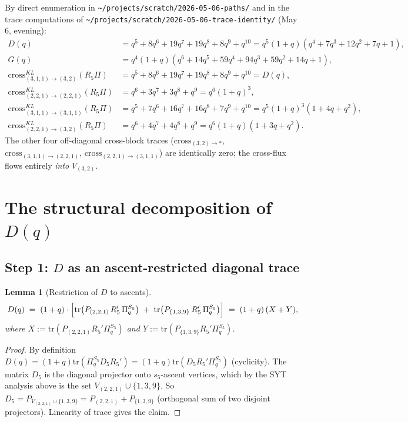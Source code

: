 \documentclass[11pt]{article}
\newtheorem{lemma}[theorem]{Lemma}
\theoremstyle{definition}
\begin{document}
By direct enumeration in
\texttt{\textasciitilde/projects/scratch/2026-05-06-paths/} and in the trace
computations of \texttt{\textasciitilde/projects/scratch/2026-05-06-trace-identity/}
(May 6, evening):
\begin{align*}
D(q) &= q^5 + 8q^6 + 19q^7 + 19q^8 + 8q^9 + q^{10} = q^5(1+q)(q^4 + 7q^3 + 12q^2 + 7q + 1), \\
G(q) &= q^4(1+q)(q^6 + 14q^5 + 59q^4 + 94q^3 + 59q^2 + 14q + 1), \\
\mathrm{cross}_{(3,1,1) \to (3,2)}^{KL}(R_5 \Pi) &= q^5 + 8q^6 + 19q^7 + 19q^8 + 8q^9 + q^{10} = D(q),\\
\mathrm{cross}_{(2,2,1) \to (2,2,1)}^{KL}(R_5 \Pi) &= q^6 + 3q^7 + 3q^8 + q^9 = q^6(1+q)^3,\\
\mathrm{cross}_{(3,1,1) \to (3,1,1)}^{KL}(R_5 \Pi) &= q^5 + 7q^6 + 16q^7 + 16q^8 + 7q^9 + q^{10} = q^5(1+q)^3(1+4q+q^2),\\
\mathrm{cross}_{(2,2,1) \to (3,2)}^{KL}(R_5 \Pi) &= q^6 + 4q^7 + 4q^8 + q^9 = q^6(1+q)(1+3q+q^2).
\end{align*}
The other four off-diagonal cross-block traces ($\mathrm{cross}_{(3,2)\to *}$, $\mathrm{cross}_{(3,1,1)\to(2,2,1)}$, $\mathrm{cross}_{(2,2,1)\to(3,1,1)}$) are identically zero; the cross-flux flows entirely \emph{into} $V_{(3,2)}$.

\section{The structural decomposition of $D(q)$}

\subsection*{Step 1: $D$ as an ascent-restricted diagonal trace}

\begin{lemma}[Restriction of $D$ to ascents]\label{lem:D-ascent}
\[
D(q) \;=\; (1+q) \cdot \Bigl[ \mathrm{tr}\bigl(P_{(2,2,1)}\, R_5'\, \Pi_q^{S_5}\bigr) \;+\; \mathrm{tr}\bigl(P_{\{1,3,9\}}\, R_5'\, \Pi_q^{S_5}\bigr) \Bigr]
\;=\; (1+q)\,(X + Y),
\]
where $X := \mathrm{tr}(P_{(2,2,1)} R_5' \Pi_q^{S_5})$ and $Y := \mathrm{tr}(P_{\{1,3,9\}} R_5' \Pi_q^{S_5})$.
\end{lemma}

\begin{proof}
By definition $D(q) = (1+q) \mathrm{tr}(\Pi_q^{S_5} D_5 R_5') = (1+q) \mathrm{tr}(D_5 R_5' \Pi_q^{S_5})$
(cyclicity). The matrix $D_5$ is the diagonal projector onto $s_5$-ascent vertices,
which by the SYT analysis above is the set $V_{(2,2,1)} \cup \{1, 3, 9\}$. So
$D_5 = P_{V_{(2,2,1)} \cup \{1,3,9\}} = P_{(2,2,1)} + P_{\{1,3,9\}}$ (orthogonal sum
of two disjoint projectors). Linearity of trace gives the claim.
\end{proof}
\end{document}
